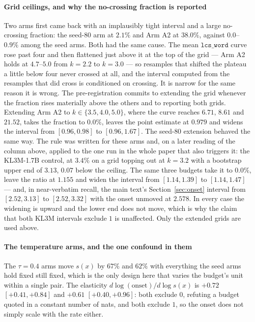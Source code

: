 \paragraph{Grid ceilings, and why the no-crossing fraction is reported}
Two arms first came back with an implausibly tight interval and a large no-crossing fraction: the
seed-$80$ arm at $2.1\%$ and Arm A2 at $38.0\%$, against $0.0$--$0.9\%$ among the seed arms. Both had
the same cause. The mean $\texttt{lcs\_word}$ curve rose past four and then flattened just above it
at the top of the grid --- Arm A2 holds at $4.7$--$5.0$ from $k = 2.2$ to $k = 3.0$ --- so resamples
that shifted the plateau a little below four never crossed at all, and the interval computed from
the resamples that did cross is conditioned on crossing. It is narrow for the same reason it is
wrong. The pre-registration commits to extending the grid whenever the fraction rises materially
above the others and to reporting both grids. Extending Arm A2 to $k \in \{3.5, 4.0, 5.0\}$, where
the curve reaches $6.71$, $8.61$ and $21.52$, takes the fraction to $0.0\%$, leaves the point
estimate at $0.979$ and widens the interval from $[0.96, 0.98]$ to $[0.96, 1.67]$. The seed-$80$
extension behaved the same way. The rule was written for these arms and, on a later reading of the
column above, applied to the one run in the whole paper that also triggers it: the KL3M-1.7B control,
at $3.4\%$ on a grid topping out at $k = 3.2$ with a bootstrap upper end of $3.13$, $0.07$ below the
ceiling. The same three budgets take it to $0.0\%$, leave the ratio at $1.155$ and widen the interval
from $[1.14, 1.39]$ to $[1.14, 1.47]$ --- and, in near-verbatim recall, the main text's
Section~\ref{sec:onset} interval from $[2.52, 3.13]$ to $[2.52, 3.32]$ with the onset unmoved at
$2.578$. In every case the widening is upward and the lower end does not move, which is why the
claim that both KL3M intervals exclude $1$ is unaffected. Only the extended grids are used above.

\paragraph{The temperature arms, and the one confound in them}
The $\tau = 0.4$ arms move $s(x)$ by $67\%$ and $62\%$ with everything the seed arms hold fixed
still fixed, which is the only design here that varies the budget's unit within a single pair. The
elasticity $d\log(\text{onset})/d\log s(x)$ is $+0.72$ $[+0.41, +0.84]$ and $+0.61$ $[+0.40, +0.96]$:
both exclude $0$, refuting a budget quoted in a constant number of nats, and both exclude $1$, so
the onset does not simply scale with the rate either.

